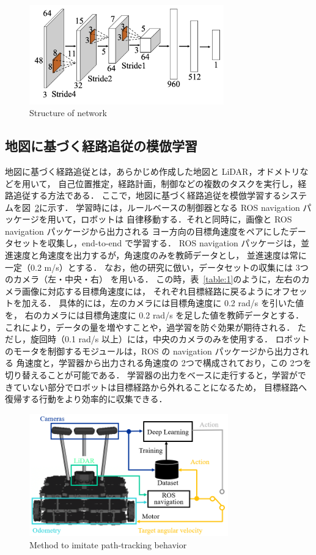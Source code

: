 \documentclass{jarticle}
\renewcommand{\figurename}{図~}
\renewcommand{\tablename}{表~}
\newcommand{\figref}[1]{\figurename\ref{#1}}
\newcommand{\tabref}[1]{\tablename\ref{#1}}
\begin{document}
\begin{figure}[h!]
  \centering
   \includegraphics[height=43mm]{pdf/network.pdf}
   \caption{Structure of network}
   \label{fig:2}
\end{figure}


\subsection{地図に基づく経路追従の模倣学習}
地図に基づく経路追従とは，あらかじめ作成した地図と LiDAR，オドメトリなどを用いて，
自己位置推定，経路計画，制御などの複数のタスクを実行し，経路追従する方法である．
ここで，地図に基づく経路追従を模倣学習するシステムを\figref{fig:3}に示す．
学習時には，ルールベースの制御器となる ROS navigation パッケージ\cite{navigation}を用いて，ロボットは
自律移動する．それと同時に，画像と ROS navigation パッケージから出力される
ヨー方向の目標角速度をペアにしたデータセットを収集し，end-to-end で学習する．
ROS navigation パッケージは，並進速度と角速度を出力するが，角速度のみを教師データとし，
並進速度は常に一定（0.2 m/s）とする．
なお，他の研究\cite{Moridian}\cite{Bojarski}に倣い，データセットの収集には 3つのカメラ（左・中央・右）
を用いる．
この時，\tabref{table:1}のように，左右のカメラ画像に対応する目標角速度には，
それぞれ目標経路に戻るようにオフセットを加える．
具体的には，左のカメラには目標角速度に 0.2 rad/s を引いた値を，
右のカメラには目標角速度に 0.2 rad/s を足した値を教師データとする．
これにより，データの量を増やすことや，過学習を防ぐ効果が期待される．
ただし，旋回時（0.1 rad/s 以上）には，中央のカメラのみを使用する．
ロボットのモータを制御するモジュールは，ROS の navigation パッケージから出力される
角速度と，学習器から出力される角速度の 2つで構成されており，この 2つを切り替えることが可能である．
学習器の出力をベースに走行すると，学習ができていない部分でロボットは目標経路から外れることになるため，
目標経路へ復帰する行動をより効率的に収集できる．

\begin{figure}[h!]
  \centering
   \includegraphics[height=53mm]{./png/learn.png}
   \caption{Method to imitate path-tracking behavior}
   \label{fig:3}
\end{figure}
\end{document}
